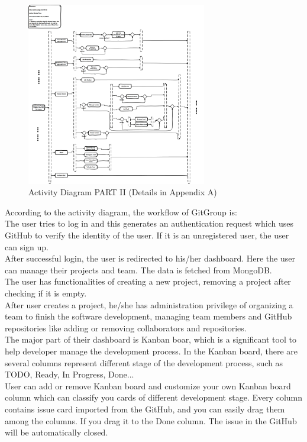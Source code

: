 \documentclass[12pt,a4paper]{report}
\begin{document}
\begin{figure}[H]
	\centering
	\includegraphics[width=0.7\textwidth]{./pics/ActivatyDiagramPARTII.png}
	\caption{Activity Diagram PART II (Details in Appendix A)}
\end{figure}
According to the activity diagram, the workflow of GitGroup is:\\
The user tries to log in and this generates an authentication request which uses GitHub to verify the identity of the user.
If it is an unregistered user, the user can sign up.\\
After successful login, the user is redirected to his/her dashboard. Here the user can manage their projects and team. The data is fetched from MongoDB.\\
The user has functionalities of creating a new project, removing a project after checking if it is empty.\\
After user creates a project, he/she has administration privilege of organizing a team to finish the software development, managing team members and GitHub repositories like adding or removing collaborators and repositories.\\
The major part of their dashboard is Kanban boar, which is a significant tool to help developer manage the development process. In the Kanban board, there are several columns represent different stage of the development process, such as TODO, Ready, In Progress, Done... \\
User can add or remove Kanban board and customize your own Kanban board column which can classify you cards of different development stage. Every column contains issue card imported from the GitHub, and you can easily drag them among the columns. If you drag it to the Done column. The issue in the GitHub will be automatically closed.  \\
\end{document}
